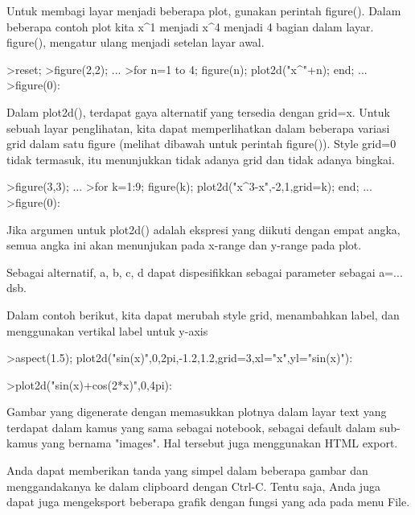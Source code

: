 \documentclass[a4paper,10pt]{article}
\begin{document}
\begin{eulernotebook}
\begin{eulercomment}
\begin{eulercomment}
\begin{eulercomment}
\begin{eulercomment}
\begin{eulercomment}
\begin{eulercomment}
\begin{eulercomment}
Untuk membagi layar menjadi beberapa plot, gunakan perintah figure().
Dalam beberapa contoh plot kita x\textasciicircum{}1 menjadi x\textasciicircum{}4 menjadi 4 bagian dalam
layar. figure(), mengatur ulang menjadi setelan layar awal.  
\end{eulercomment}
\begin{eulerprompt}
>reset;
>figure(2,2); ...
>for n=1 to 4; figure(n); plot2d("x^"+n); end; ...
>figure(0):
\end{eulerprompt}
\begin{eulercomment}
Dalam plot2d(), terdapat gaya alternatif yang tersedia dengan grid=x.
Untuk sebuah layar penglihatan, kita dapat memperlihatkan dalam
beberapa variasi grid dalam satu figure (melihat dibawah untuk
perintah figure()). Style grid=0 tidak termasuk, itu menunjukkan tidak
adanya grid dan tidak adanya bingkai. 
\end{eulercomment}
\begin{eulerprompt}
>figure(3,3); ...
>for k=1:9; figure(k); plot2d("x^3-x",-2,1,grid=k); end; ...
>figure(0):
\end{eulerprompt}
\begin{eulercomment}
Jika argumen untuk plot2d() adalah ekspresi yang diikuti dengan empat
angka, semua angka ini akan menunjukan pada x-range dan y-range pada
plot. 

Sebagai alternatif, a, b, c, d dapat dispesifikkan sebagai parameter
sebagai a=... dsb. 

Dalam contoh berikut, kita dapat merubah style grid, menambahkan
label, dan menggunakan vertikal label untuk y-axis 
\end{eulercomment}
\begin{eulerprompt}
>aspect(1.5); plot2d("sin(x)",0,2pi,-1.2,1.2,grid=3,xl="x",yl="sin(x)"):
\end{eulerprompt}
\begin{eulerprompt}
>plot2d("sin(x)+cos(2*x)",0,4pi):
\end{eulerprompt}
\begin{eulercomment}
Gambar yang digenerate dengan memasukkan plotnya dalam layar text yang
terdapat dalam kamus yang sama sebagai notebook, sebagai default dalam
sub-kamus yang bernama "images". Hal tersebut juga menggunakan HTML
export.

Anda dapat memberikan tanda yang simpel dalam beberapa gambar dan
menggandakanya ke dalam clipboard dengan Ctrl-C. Tentu saja, Anda juga
dapat juga mengeksport beberapa grafik dengan fungsi yang ada pada
menu File. 


\end{eulercomment}
\end{eulercomment}
\end{eulercomment}
\end{eulercomment}
\end{eulercomment}
\end{eulercomment}
\end{eulercomment}
\end{eulernotebook}
\end{document}
